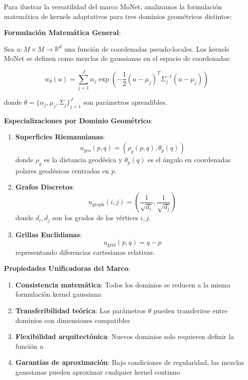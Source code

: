 \begin{example}

Para ilustrar la versatilidad del marco MoNet, analizamos la formulación matemática de kernels adaptativos para tres dominios geométricos distintos:

\textbf{Formulación Matemática General}:

Sea $u: M \times M \to \mathbb{R}^d$ una función de coordenadas pseudo-locales. Los kernels MoNet se definen como mezclas de gaussianas en el espacio de coordenadas:

\begin{equation}
w_\theta(u) = \sum_{j=1}^J \alpha_j \exp\left(-\frac{1}{2}(u - \mu_j)^T \Sigma_j^{-1} (u - \mu_j)\right)
\end{equation}

donde $\theta = \{\alpha_j, \mu_j, \Sigma_j\}_{j=1}^J$ son parámetros aprendibles.

\textbf{Especializaciones por Dominio Geométrico}:

\begin{enumerate}
    \item \textbf{Superficies Riemannianas}: 
    \begin{equation}
    u_{\text{geo}}(p,q) = (\rho_g(p,q), \theta_p(q))
    \end{equation}
    donde $\rho_g$ es la distancia geodésica y $\theta_p(q)$ es el ángulo en coordenadas polares geodésicas centradas en $p$.
    
    \item \textbf{Grafos Discretos}:
    \begin{equation}
    u_{\text{graph}}(i,j) = \left(\frac{1}{\sqrt{d_i}}, \frac{1}{\sqrt{d_j}}\right)
    \end{equation}
    donde $d_i, d_j$ son los grados de los vértices $i, j$.
    
    \item \textbf{Grillas Euclidianas}:
    \begin{equation}
    u_{\text{grid}}(p,q) = q - p
    \end{equation}
    representando diferencias cartesianas relativas.
\end{enumerate}

\textbf{Propiedades Unificadoras del Marco}:
\begin{enumerate}
    \item \textbf{Consistencia matemática}: Todos los dominios se reducen a la misma formulación kernel gaussiana
    \item \textbf{Transferibilidad teórica}: Los parámetros $\theta$ pueden transferirse entre dominios con dimensiones compatibles
    \item \textbf{Flexibilidad arquitectónica}: Nuevos dominios solo requieren definir la función $u$
    \item \textbf{Garantías de aproximación}: Bajo condiciones de regularidad, las mezclas gaussianas pueden aproximar cualquier kernel continuo
\end{enumerate}
\end{example}

